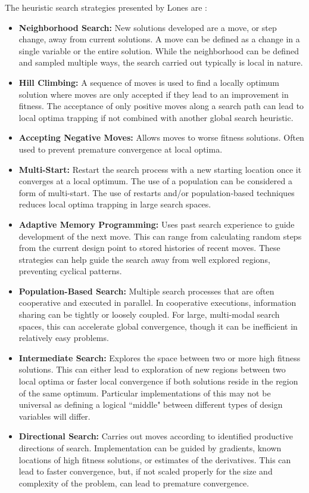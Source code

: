 \documentclass{article}                                                                           %
\begin{document}
The heuristic search strategies presented by Lones are \cite{Lones2014}: 
\begin{itemize}
  \item \textbf{Neighborhood Search:} New solutions developed are a move, or step change, away from current solutions.  A move can be defined as a change in a single variable or the entire solution. While the neighborhood can be defined and sampled multiple ways, the search carried out typically is local in nature. 
  \item \textbf{Hill Climbing:} A sequence of moves is used to find a locally optimum solution where moves are only accepted if they lead to an improvement in fitness.  The acceptance of only positive moves along a search path can lead to local optima trapping if not combined with another global search heuristic.  
  \item \textbf{Accepting Negative Moves:} Allows moves to worse fitness solutions.  Often used to prevent premature convergence at local optima.
  \item \textbf{Multi-Start:} Restart the search process with a new starting location once it converges at a local optimum.  The use of a population can be considered a form of multi-start.  The use of restarts and/or population-based techniques reduces local optima trapping in large search spaces.
  \item \textbf{Adaptive Memory Programming:} Uses past search experience to guide development of the next move.  This can range from calculating random steps from the current design point to stored histories of recent moves.  These strategies can help guide the search away from well explored regions, preventing cyclical patterns.
  \item \textbf{Population-Based Search:} Multiple search processes that are often cooperative and executed in parallel.  In cooperative executions, information sharing can be tightly or loosely coupled.  For large, multi-modal search spaces, this can accelerate global convergence, though it can be inefficient in relatively easy problems.   
  \item \textbf{Intermediate Search:}  Explores the space between two or more high fitness solutions.  This can either lead to exploration of new regions between two local optima or faster local convergence if both solutions reside in the region of the same optimum. Particular implementations of this may not be universal as defining a logical ``middle" between different types of design variables will differ.   
  \item \textbf{Directional Search:} Carries out moves according to identified productive directions of search. Implementation can be guided by gradients, known locations of high fitness solutions, or estimates of the derivatives.  This can lead to faster convergence, but, if not scaled properly for the size and complexity of the problem, can lead to premature convergence.  

\end{itemize}
\end{document}
